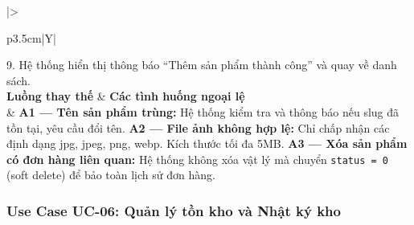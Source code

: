 \documentclass[11pt, a4paper]{article}
\begin{document}
\begin{table}[H]
\begin{tabularx}{\linewidth}{|>{\raggedright\arraybackslash}p{3.5cm}|Y|}
          9. Hệ thống hiển thị thông báo ``Thêm sản phẩm thành công'' và quay về danh sách. \\ \hline
        \textbf{Luồng thay thế} & \textbf{Các tình huống ngoại lệ} \\ \hline
        & \textbf{A1 --- Tên sản phẩm trùng:} Hệ thống kiểm tra và thông báo nếu slug đã tồn tại, yêu cầu đổi tên. \newline
          \textbf{A2 --- File ảnh không hợp lệ:} Chỉ chấp nhận các định dạng jpg, jpeg, png, webp. Kích thước tối đa 5MB. \newline
          \textbf{A3 --- Xóa sản phẩm có đơn hàng liên quan:} Hệ thống không xóa vật lý mà chuyển \texttt{status = 0} (soft delete) để bảo toàn lịch sử đơn hàng. \\ \hline
    \end{tabularx}
\end{table}

\subsubsection{Use Case UC-06: Quản lý tồn kho và Nhật ký kho}
\end{document}
